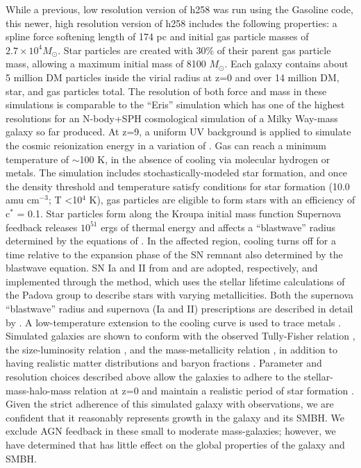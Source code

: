 \documentclass[manuscript]{aastex}
\begin{document}
While a previous, low resolution version of h258 was run using the Gasoline code, this newer, high resolution version of h258 includes the following properties: a spline force softening length of 174 pc and initial gas particle masses of $2.7 \times 10^4 M_{\odot}$. Star particles are created with 30$\%$ of their parent gas particle mass, allowing a maximum initial mass of 8100 $M_{\odot}$. Each galaxy contains about 5 million DM particles inside the virial radius at z=0 and over 14 million DM, star, and gas particles total. The resolution of both force and mass in these simulations is comparable to the ``Eris'' simulation which has one of the highest resolutions for an N-body+SPH cosmological simulation of a Milky Way-mass galaxy so far produced.  At z=9, a uniform UV background is applied to simulate the cosmic reionization energy in a variation of \cite{Haardt2012}.
Gas can reach a minimum temperature of $\sim$100 K, in the absence of cooling via molecular hydrogen or metals. The simulation includes stochastically-modeled star formation, and once the density threshold and temperature satisfy conditions for star formation (10.0 amu cm$^{-3}$; T \textless 10$^4$ K), gas particles are eligible to form stars with an efficiency of c$^*$ = 0.1. Star particles form along the Kroupa initial mass function \citep{Kroupa1993} Supernova feedback releases $10^{51}$ ergs of thermal energy and affects a ``blastwave'' radius determined by the equations of \cite{Ostriker1988}. In the affected region, cooling turns off for a time relative to the expansion phase of the SN remnant also determined by the blastwave equation. SN Ia and II from \cite{Thielemann1986} and \cite{Woosley1995} are adopted, respectively, and implemented through the \cite{Raiteri1996} method, which uses the stellar lifetime calculations of the Padova group \citep{Alongi1993, Bressan1993, Bertelli1994} to describe stars with varying metallicities. Both the supernova ``blastwave'' radius and supernova (Ia and II) prescriptions are described in detail by \cite{Stinson2006}. A low-temperature extension to the cooling curve is used to trace metals \citep{Bromm2001}. Simulated galaxies are shown to conform with the observed Tully-Fisher relation \citep{Governato2009}, the size-luminosity relation \citep{Brooks2011}, and the mass-metallicity relation \citep{Brooks2007,Christensen2015}, in addition to having realistic matter distributions and baryon fractions \citep{Governato2009a,Guedes2011}. Parameter and resolution choices described above allow the galaxies to adhere to the stellar-mass-halo-mass relation at z=0 and maintain a realistic period of star formation \citep{Moster2010,Munshi2013,Brooks2007,Maiolino2008}. Given the strict adherence of this simulated galaxy with observations, we are confident that it reasonably represents growth in the galaxy and its SMBH. We exclude AGN feedback in these small to moderate mass-galaxies; however, we have determined that has little effect on the global properties of the galaxy and SMBH.
 
\end{document}
